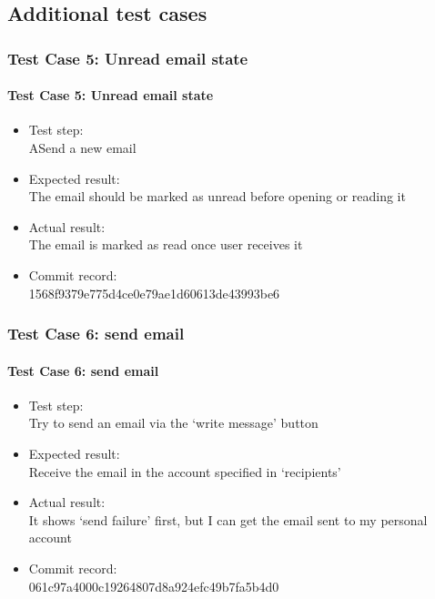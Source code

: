 \documentclass{article}
\begin{document}
\subsection{Additional test cases}

\subsubsection{Test Case 5: Unread email state}

\paragraph{Test Case 5: Unread email state}
\begin{itemize}
\item Test step: \\
    ASend a new email
\item Expected result: \\
    The email should be marked as unread before opening or reading it 
\item Actual result: \\
    The email is marked as read once user receives it
\item Commit record: \\
    1568f9379e775d4ce0e79ae1d60613de43993be6
\end{itemize}

\subsubsection{Test Case 6: send email}
\paragraph{Test Case 6: send email}
\begin{itemize}
\item Test step: \\
    Try to send an email via the ‘write message’ button
\item Expected result: \\
    Receive the email in the account specified in ‘recipients’
\item Actual result: \\
    It shows ‘send failure’ first, but I can get the email sent to my personal account
\item Commit record: \\
    061c97a4000c19264807d8a924efc49b7fa5b4d0
\end{itemize}
\end{document}
